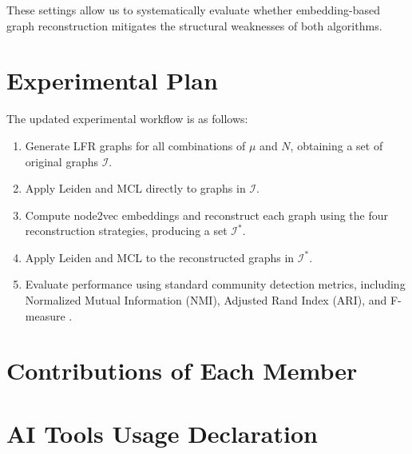 \documentclass[a4paper,11pt]{article}
\begin{document}
These settings allow us to systematically evaluate whether embedding-based graph reconstruction mitigates the structural weaknesses of both algorithms.

\section{Experimental Plan}
The updated experimental workflow is as follows:
\begin{enumerate}
    \item Generate LFR graphs for all combinations of $\mu$ and $N$, obtaining a set of original graphs $\mathcal{I}$.
    \item Apply Leiden and MCL directly to graphs in $\mathcal{I}$.
    \item Compute node2vec embeddings and reconstruct each graph using the four reconstruction strategies, producing a set $\mathcal{I}^*$.
    \item Apply Leiden and MCL to the reconstructed graphs in $\mathcal{I}^*$.
    \item Evaluate performance using standard community detection metrics, including Normalized Mutual Information (NMI), Adjusted Rand Index (ARI), and F-measure \cite{malliaros2013clustering}.
\end{enumerate}




\section*{Contributions of Each Member}

\section*{AI Tools Usage Declaration}
\end{document}

